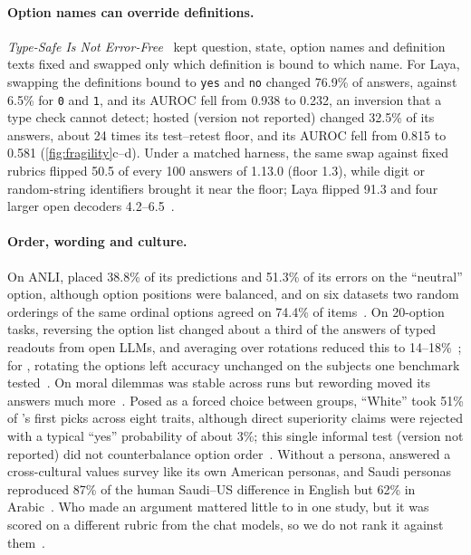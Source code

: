\paragraph{Option names can override definitions.}
\emph{Type-Safe Is Not Error-Free}~\cite{arx26758} kept question, state, option names and definition texts fixed and swapped only which definition is bound to which name.
For Laya, swapping the definitions bound to \texttt{yes} and \texttt{no} changed 76.9\% of answers, against 6.5\% for \texttt{0} and \texttt{1}, and its AUROC fell from 0.938 to 0.232, an inversion that a type check cannot detect; hosted \jev{} (version not reported) changed 32.5\% of its answers, about 24 times its test--retest floor, and its AUROC fell from 0.815 to 0.581 (\cref{fig:fragility}c--d).
Under a matched harness, the same swap against fixed rubrics flipped 50.5 of every 100 answers of \jev{} 1.13.0 (floor 1.3), while digit or random-string identifiers brought it near the floor; Laya flipped 91.3 and four larger open decoders 4.2--6.5~\cite{arx00346}.

\paragraph{Order, wording and culture.}
On ANLI, \jev{} placed 38.8\% of its predictions and 51.3\% of its errors on the ``neutral'' option, although option positions were balanced, and on six datasets two random orderings of the same ordinal options agreed on 74.4\% of items~\cite{arx38827}.
On 20-option tasks, reversing the option list changed about a third of the answers of typed readouts from open LLMs, and averaging over rotations reduced this to 14--18\%~\cite{arx00831}; for \jev{}, rotating the options left accuracy unchanged on the subjects one benchmark tested~\cite{arx37647}.
On moral dilemmas \jev{} was stable across runs but rewording moved its answers much more~\cite{zen23023694}\zmark{}.
Posed as a forced choice between groups, ``White'' took 51\% of \jev{}'s first picks across eight traits, although direct superiority claims were rejected with a typical ``yes'' probability of about 3\%; this single informal test (version not reported) did not counterbalance option order~\cite{simmons2026saidno}\gmark{}.
Without a persona, \jev{} answered a cross-cultural values survey like its own American personas, and Saudi personas reproduced 87\% of the human Saudi--US difference in English but 62\% in Arabic~\cite{arx36399}.
Who made an argument mattered little to \jev{} in one study, but it was scored on a different rubric from the chat models, so we do not rank it against them~\cite{arx35286}.


